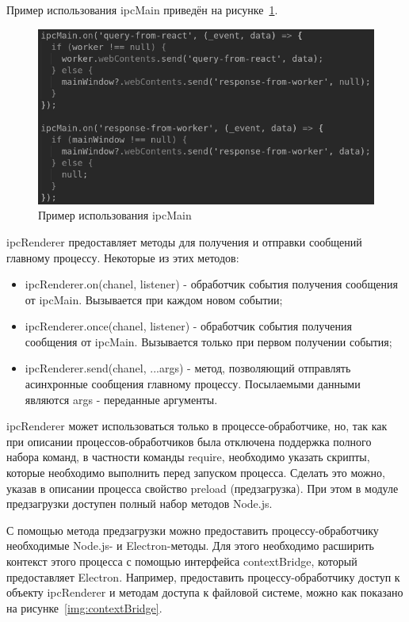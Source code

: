 Пример использования ipcMain приведён на рисунке~\ref{img:ipcMain}.

\begin{figure}[H]
  \centering
  \includegraphics[height=0.2\textheight]{assets/images/practical/ipcMain.png}
  \caption{Пример использования ipcMain}
  \label{img:ipcMain}
\end{figure}

ipcRenderer предоставляет методы для получения и отправки сообщений главному процессу. Некоторые из этих методов:

\begin{itemize}
  \item ipcRenderer.on(chanel, listener) - обработчик события получения сообщения от ipcMain. Вызывается при каждом новом событии;
  \item ipcRenderer.once(chanel, listener) - обработчик события получения сообщения от ipcMain. Вызывается только при первом получении события;
  \item ipcRenderer.send(chanel, ...args) - метод, позволяющий отправлять асинхронные сообщения главному процессу. Посылаемыми данными являются args - переданные аргументы.
\end{itemize}

ipcRenderer может использоваться только в процессе-обработчике, но, так как при описании процессов-обработчиков была отключена поддержка полного набора команд, в частности команды require, необходимо указать скрипты, которые необходимо выполнить перед запуском процесса. Сделать это можно, указав в описании процесса свойство preload (предзагрузка). При этом в модуле предзагрузки доступен полный набор методов Node.js.

С помощью метода предзагрузки можно предоставить процессу-обработчику необходимые Node.js- и Electron-методы. Для этого необходимо расширить контекст этого процесса с помощью интерфейса contextBridge, который предоставляет Electron. Например, предоставить процессу-обработчику доступ к объекту ipcRenderer и методам доступа к файловой системе, можно как показано на рисунке~\ref{img:contextBridge}.

